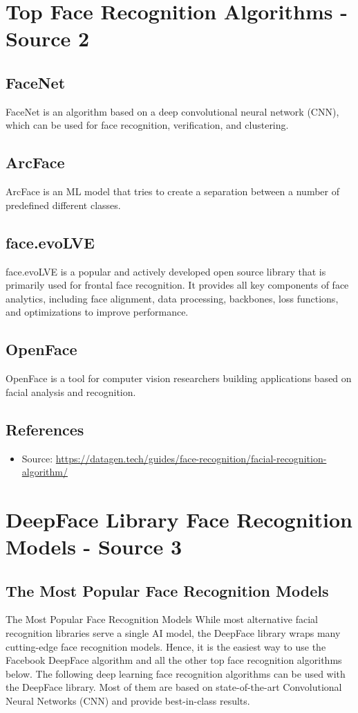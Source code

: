 \documentclass[11pt]{article}
\begin{document}
\section{Top Face Recognition Algorithms - Source 2}

\subsection{FaceNet}
FaceNet is an algorithm based on a deep convolutional neural network (CNN), which can be used for face recognition, verification, and clustering.


\subsection{ArcFace}
ArcFace is an ML model that tries to create a separation between a number of predefined different classes. 

\subsection{face.evoLVE}
face.evoLVE is a popular and actively developed open source library that is primarily used for frontal face recognition. It provides all key components of face analytics, including face alignment, data processing, backbones, loss functions, and optimizations to improve performance.


\subsection{OpenFace}
OpenFace is a tool for computer vision researchers building applications based on facial analysis and recognition.


\subsection{References}
\begin{itemize}
    \item Source: \url{https://datagen.tech/guides/face-recognition/facial-recognition-algorithm/}
\end{itemize}


\section{DeepFace Library Face Recognition Models - Source 3}

\subsection{The Most Popular Face Recognition Models}
The Most Popular Face Recognition Models While most alternative facial recognition libraries serve a single AI model, the DeepFace library wraps many cutting-edge face recognition models. Hence, it is the easiest way to use the Facebook DeepFace algorithm and all the other top face recognition algorithms below. The following deep learning face recognition algorithms can be used with the DeepFace library. Most of them are based on state-of-the-art Convolutional Neural Networks (CNN) and provide best-in-class results.
\end{document}
